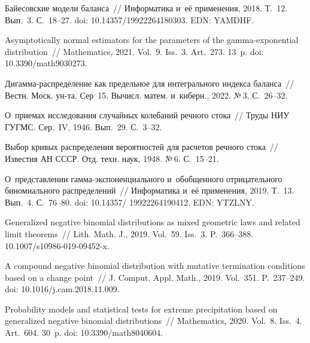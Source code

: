 \begin{multicols}{2}
\vspace*{-12pt}


{\small\frenchspacing
 {\baselineskip=10.51pt
 \begin{thebibliography}{99}
Байесовские модели баланса~// Информатика и~её применения, 2018. Т.~12. Вып.~3. С.~18--27.
doi: 10.14357/19922264180303. EDN: YAMDHF.

Asymptotically normal estimators for the parameters of the gamma-exponential 
distribution~// Mathematics, 2021. Vol.~9. Iss.~3. Art.~273. 13~p. doi: 10.3390/math9030273. 

Ди\-гам\-ма-рас\-пре\-де\-ле\-ние как предельное для интегрального индекса баланса~// Вестн. Моск. ун-та. Сер~15. Вычисл. матем. и~киберн., 2022. №\,3. 
С.~26--32.

О~приемах исследования случайных колебаний речного стока~// Труды НИУ ГУГМС. Сер.~IV, 1946. Вып.~29. С.~3--32.

Выбор кривых распределения вероятностей для расчетов речного стока~// Известия АН СССР. Отд. техн. наук, 1948. №\,6. С.~\mbox{15--21}.

О~представлении гам\-ма-экс\-по\-нен\-ци\-аль\-но\-го и~обобщенного отрицательного 
биномиального распределений~// Информатика и~её применения, 2019. Т.~13. Вып.~4. С.~76--80.
doi: 10.14357/ 19922264190412. EDN: YTZLNY.

Generalized negative binomial distributions as mixed geometric laws and related 
limit theorems~// Lith. Math. J., 2019. Vol.~59. Iss.~3. P.~366--388.
10.1007/s10986-019-09452-x.

A compound negative binomial distribution with mutative termination conditions 
based on a change point~// J. Comput. Appl. Math., 2019. Vol.~351. P.~237--249.
doi: 10.1016/j.cam.2018.11.009.

Probability models and statistical tests for extreme precipitation based on 
generalized negative binomial distributions~// Mathematics, 2020. Vol.~8. Iss.~4. Art.~604. 30~p. doi: 10.3390/math8040604.



\end{thebibliography}}}
\end{multicols}
